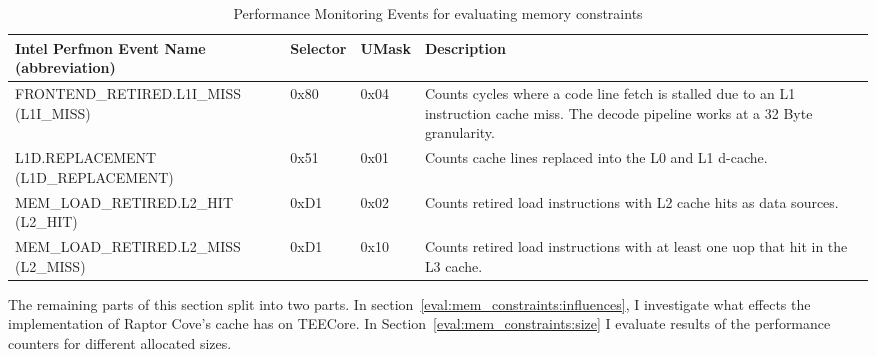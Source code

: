 \begin{table}[ht]
  \centering
  \begin{tabular}{ |p{6cm}|p{1.35cm}|p{1.25cm}|p{4cm}|}
    \hline
    \makecell[l]{Intel Perfmon Event Name \\ (abbreviation)} & Selector & UMask & Description                                                                      \\
    \hline
    \makecell[l]{FRONTEND\_RETIRED.L1I\_MISS\\ (L1I\_MISS)}  & 0x80     & 0x04  & Counts cycles where a code line fetch is stalled due to an L1 instruction cache miss. The decode pipeline works at a 32 Byte granularity. \\
    \makecell[l]{L1D.REPLACEMENT \\ (L1D\_REPLACEMENT)}      & 0x51     & 0x01  & Counts cache lines replaced into the L0 and L1 d-cache.                          \\
    MEM\_LOAD\_RETIRED.L2\_HIT (L2\_HIT)                     & 0xD1     & 0x02  & Counts retired load instructions with L2 cache hits as data sources.             \\
    MEM\_LOAD\_RETIRED.L2\_MISS (L2\_MISS)                   & 0xD1     & 0x10  & Counts retired load instructions with at least one uop that hit in the L3 cache. \\
    \hline
  \end{tabular}
  \caption{Performance Monitoring Events for evaluating memory constraints}
  \label{50:tab:events}
\end{table}

The remaining parts of this section split into two parts. In
section~\ref{eval:mem_constraints:influences}, I investigate what effects the
implementation of Raptor Cove's cache has on TEECore. In
Section~\ref{eval:mem_constraints:size} I evaluate results of the performance
counters for different allocated sizes.
\FloatBarrier

